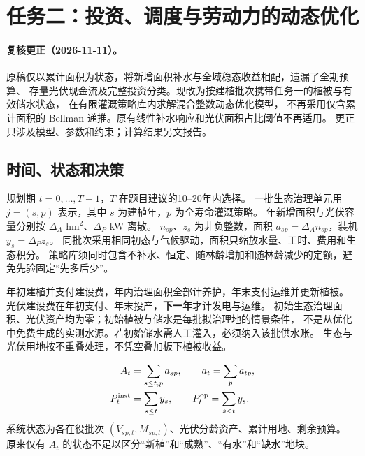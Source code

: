 \section{任务二：投资、调度与劳动力的动态优化}\label{sec:t2}

\paragraph{复核更正（2026-11-11）。}
原稿仅以累计面积为状态，将新增面积补水与全域稳态收益相配，遗漏了全期预算、
存量光伏现金流及完整投资分类。现改为按建植批次携带任务一的植被与有效储水状态，
在有限灌溉策略库内求解混合整数动态优化模型，
不再采用仅含累计面积的 Bellman 递推。原有线性补水响应和光伏面积占比阈值不再适用。
更正只涉及模型、参数和约束；计算结果另文报告。

\subsection{时间、状态和决策}
规划期 $t=0,\ldots,T-1$，$T$ 在题目建议的10--20年内选择。
一批生态治理单元用 $j=(s,p)$ 表示，其中 $s$ 为建植年，$p$ 为全寿命灌溉策略。
年新增面积与光伏容量分别按 $\Delta_A$ hm$^2$、$\Delta_P$ kW 离散。
$n_{sp}$、$z_s$ 为非负整数，面积 $a_{sp}=\Delta_A n_{sp}$，装机 $y_s=\Delta_Pz_s$。
同批次采用相同初态与气候驱动，面积只缩放水量、工时、费用和生态积分。
策略库须同时包含不补水、恒定、随林龄增加和随林龄减少的定额，避免先验固定“先多后少”。

年初建植并支付建设费，年内治理面积全部计养护，年末支付运维并更新植被。
光伏建设费在年初支付、年末投产，\textbf{下一年}才计发电与运维。
初始生态治理面积、光伏资产均为零；初始植被与储水是每批拟治理地的情景条件，
不是从优化中免费生成的实测水源。若初始储水需人工灌入，必须纳入该批供水账。
生态与光伏用地按不重叠处理，不凭空叠加板下植被收益。

\begin{align}
A_t&=\sum_{s\le t,p}a_{sp},\qquad a_t=\sum_p a_{tp},\\
P_t^{\rm inst}&=\sum_{s\le t}y_s,\qquad P_t^{\rm op}=\sum_{s<t}y_s.
\end{align}
系统状态为各在役批次 $(V_{sp,t},M_{sp,t})$、光伏分龄资产、累计用地、剩余预算。
原来仅有 $A_t$ 的状态不足以区分“新植”和“成熟”、“有水”和“缺水”地块。

